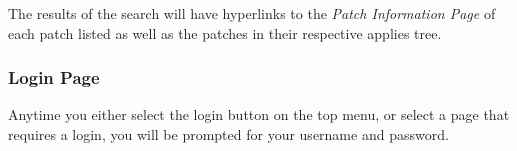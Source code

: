 The results of the search will have hyperlinks to the \emph{Patch Information
Page} of each patch listed as well as the patches in their respective applies 
tree.

\begin{center}
\end{center}

\subsubsection{Login Page}
Anytime you either select the login button on the top menu, or select a page that 
requires a login, you will be prompted for your username and password.

\begin{center}
\end{center}

